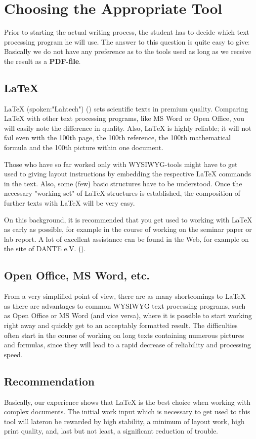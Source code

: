 \chapter{Choosing the Appropriate Tool}

Prior to starting the actual writing process, the student has to decide which text
processing program he will use. The answer to this question is quite easy to give:
Basically we do not have any preference as to the tools used as long as we receive
the result as a \textbf{PDF-file}.


\section{LaTeX}

LaTeX (spoken:"Lahtech") (\cite{latex_book,latex}) sets scientific texts
in premium quality. Comparing LaTeX with other text processing programs, like MS Word
or Open Office, you will easily note the difference in quality. Also, LaTeX is highly
reliable; it will not fail even with the 100th page, the 100th reference, the 100th
mathematical formula and the 100th picture within one document.

Those who have so far worked only with WYSIWYG-tools might have to get used to
giving layout instructions by embedding the respective LaTeX commands in the text.
Also, some (few) basic structures have to be understood. Once the necessary
"working set" of LaTeX-structures is established, the composition of
further texts with LaTeX will be very easy.

On this background, it is recommended that you get used to working with LaTeX as early
as possible, for example in the course of working on the seminar paper or lab report.
A lot of excellent assistance can be found in the Web, for example on the site of
DANTE e.V. (\cite{dante}).


\section{Open Office, MS Word, etc.}

From a very simplified point of view, there are as many shortcomings to LaTeX as there
are advantages to common WYSIWYG text processing programs, such as Open Office or MS Word
(and vice versa), where it is possible to start working right away and quickly get to
an acceptably formatted result. The difficulties often start in the course of working
on long texts containing numerous pictures and formulas, since they will lead to a rapid
decrease of reliability and processing speed.


\section{Recommendation}
Basically, our experience shows that LaTeX is the best choice when working with complex
documents. The initial work input which is necessary to get used to this tool will lateron
be rewarded by high stability, a minimum of layout work, high print quality, and, last
but not least, a significant reduction of trouble.
